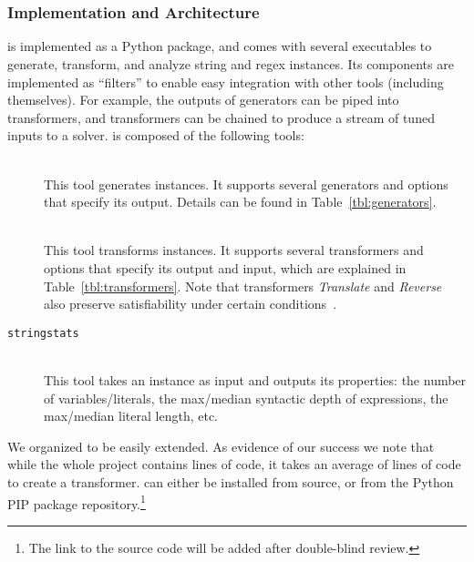 \section{\fuzzer{}}
\label{sec:fuzzer}

\subsubsection{Implementation and Architecture}

\fuzzer{} is implemented as a Python package, and comes with several
executables to generate, transform, and analyze \smtfull{} string and regex
instances. Its components are implemented as \unix{} ``filters'' to enable easy
integration with other tools (including themselves). For example, the
outputs of generators can be piped into transformers, and transformers
can be chained to produce a stream of tuned inputs to a
solver. \fuzzer{} is composed of the following tools:

\begin{description}
    \item[\generator{}] \hfill \\
    This tool generates \smt{} instances. It supports several generators and
    options that specify its output. Details can be found in
    Table~\ref{tbl:generators}.
    \item[\transformer{}] \hfill \\
    This tool transforms \smt{}
    instances. It supports several transformers and options that specify
    its output and input, which are explained in
    Table~\ref{tbl:transformers}. Note that transformers
    \textit{Translate} and \textit{Reverse} also preserve
    satisfiability under certain conditions~\cite{ifaz}.
    \item[\texttt{stringstats}] \hfill \\
    This tool takes an \smt{}
    instance as input and outputs its properties: the number of
    variables/literals, the max/median syntactic depth of expressions, the
    max/median literal length, etc.
\end{description}

We organized \fuzzer{} to be easily extended. As evidence of our success we note
that while the whole project 
contains \linesInFuzzer{} lines of code, it takes an average of 
\linesPerX{} lines of code to create a transformer. \fuzzer{} can either be 
installed from source, or from the Python PIP package
repository.\footnote{The link to the source code will be added after double-blind review.}

